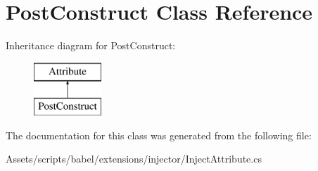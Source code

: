 \hypertarget{class_post_construct}{\section{Post\-Construct Class Reference}
\label{class_post_construct}
}
Inheritance diagram for Post\-Construct\-:\begin{figure}[H]
\begin{center}
\leavevmode
\includegraphics[height=2.000000cm]{class_post_construct}
\end{center}
\end{figure}


The documentation for this class was generated from the following file\-:\begin{DoxyCompactItemize}
\item 
Assets/scripts/babel/extensions/injector/Inject\-Attribute.\-cs\end{DoxyCompactItemize}

